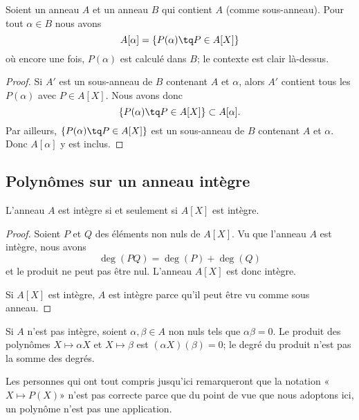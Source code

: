 \begin{proposition}     \label{PROPooPMNSooOkHOxJ}
    Soient un anneau \( A\) et un anneau \( B\) qui contient \( A\) (comme sous-anneau). Pour tout \( \alpha\in B\) nous avons
    \begin{equation}
        A[\alpha]=\{ P(\alpha)\tq P\in A[X] \}
    \end{equation}
    où encore une fois, \( P(\alpha)\) est calculé dans \( B\); le contexte est clair là-dessus.
\end{proposition}

\begin{proof}
    Si \( A'\) est un sous-anneau de \( B\) contenant \( A\) et \( \alpha\), alors \( A'\) contient tous les \( P(\alpha)\) avec \( P\in A[X]\). Nous avons donc
    \begin{equation}
        \{ P(\alpha)\tq P\in A[X] \}\subset A[\alpha].
    \end{equation}
    Par ailleurs, \( \{ P(\alpha)\tq P\in A[X] \}\) est un sous-anneau de \( B\) contenant \( A\) et \( \alpha\). Donc \( A[\alpha]\) y est inclus.
\end{proof}

\subsection{Polynômes sur un anneau intègre}

\begin{theorem}     \label{ThoBUEDrJ}
    L'anneau \( A\) est intègre si et seulement si \( A[X]\) est intègre.
\end{theorem}

\begin{proof}
    Soient \( P\) et \( Q\) des éléments non nuls de \( A[X]\). Vu que l'anneau \( A\) est intègre, nous avons
    \begin{equation}
        \deg(PQ)=\deg(P)+\deg(Q)
    \end{equation}
    et le produit ne peut pas être nul. L'anneau \( A[X]\) est donc intègre.

    Si \( A[X]\) est intègre, \( A\) est intègre parce qu'il peut être vu comme sous anneau.
\end{proof}

\begin{normaltext}
    Si \( A\) n'est pas intègre, soient \( \alpha,\beta\in A\) non nuls tels que \( \alpha\beta=0\). Le produit des polynômes \( X\mapsto \alpha X\) et \( X\mapsto \beta\) est \( (\alpha X)(\beta)=0\); le degré du produit n'est pas la somme des degrés.

    Les personnes qui ont tout compris jusqu'ici remarqueront que la notation «\( X\mapsto P(X)\)» n'est pas correcte parce que du point de vue que nous adoptons ici, un polynôme n'est pas une application.
\end{normaltext}

